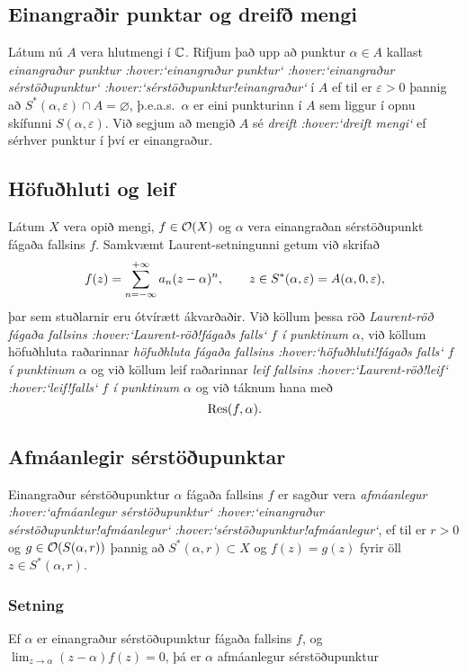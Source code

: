 \subsection*{Einangraðir punktar og dreifð mengi}

Látum nú $A$ vera hlutmengi í ${\mathbb C}$.  Rifjum það upp að punktur
$\alpha\in A$ kallast {\it einangraður punktur :hover:`einangraður
punktur` :hover:`einangraður
sérstöðupunktur` :hover:`sérstöðupunktur!einangraður`} í $A$ ef til er
$\varepsilon>0$ þannig að $S^\ast(\alpha,\varepsilon)\cap A=\varnothing$,
þ.e.a.s.~$\alpha$ er eini punkturinn í $A$ sem liggur í opnu skífunni
$S(\alpha,\varepsilon)$. Við segjum að mengið $A$ sé
{\it dreift :hover:`dreift mengi`} ef sérhver
punktur í því er einangraður. 


\subsection*{Höfuðhluti og leif}

Látum $X$ vera opið mengi,
$f\in {\cal O}(X)$ og $\alpha$ vera einangraðan sér\-stöðu\-punkt  fágaða
fallsins $f$. Samkvæmt Laurent-setningunni getum við skrifað 
$$
f(z)= \sum_{n=-\infty}\sp{+\infty}a_n(z-\alpha)\sp n, \qquad z\in 
S^\ast(\alpha,\varepsilon)=A(\alpha,0,\varepsilon),
$$
þar sem stuðlarnir eru ótvírætt ákvarðaðir.  Við köllum þessa röð
{\it Laurent-röð fágaða fallsins :hover:`Laurent-röð!fágaðs falls`
$f$ í punktinum}
$\alpha$, við köllum höfuðhluta raðarinnar {\it höfuðhluta  fágaða
fallsins :hover:`höfuðhluti!fágaðs falls` $f$ í punktinum} $\alpha$ og
við köllum leif raðarinnar {\it leif fallsins :hover:`Laurent-röð!leif`
 :hover:`leif!falls` $f$ í punktinum} $\alpha$
og við táknum hana með
$$ {\operatorname{Res}} (f,\alpha). $$


\subsection*{Afmáanlegir sérstöðupunktar}

Einangraður
sérstöðupunktur ${\alpha}$ fágaða fallsins $f$ 
er sagður vera {\it afmáanlegur :hover:`afmáanlegur
sérstöðupunktur` :hover:`einangraður
sérstöðupunktur!afmáanlegur` :hover:`sérstöðupunktur!afmáanlegur`},
ef til er $r>0$ og $g\in {\cal O}(S({\alpha},r))$ þannig að
$S^\ast({\alpha},r)\subset X$ og $f(z)=g(z)$ fyrir öll
$z\in S^\ast({\alpha},r)$.


\subsubsection{Setning}
Ef $\alpha$ er einangraður sérstöðupunktur fágaða
fallsins $f$, og  $\lim_{z\to \alpha}(z-\alpha)f(z)= 0$,
þá er $\alpha$ afmáanlegur sérstöðupunktur


